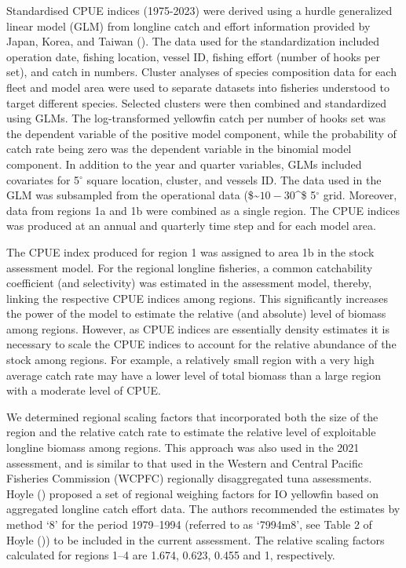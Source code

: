 \documentclass[
]{scrartcl}
\begin{document}
Standardised CPUE indices (1975-2023) were derived using a hurdle
generalized linear model (GLM) from longline catch and effort
information provided by Japan, Korea, and Taiwan
().
The data used for the standardization included operation date, fishing
location, vessel ID, fishing effort (number of hooks per set), and catch
in numbers. Cluster analyses of species composition data for each fleet
and model area were used to separate datasets into fisheries understood
to target different species. Selected clusters were then combined and
standardized using GLMs. The log-transformed yellowfin catch per number
of hooks set was the dependent variable of the positive model component,
while the probability of catch rate being zero was the dependent
variable in the binomial model component. In addition to the year and
quarter variables, GLMs included covariates for 5\(^\circ\) square
location, cluster, and vessels ID. The data used in the GLM was
subsampled from the operational data (\$\sim\(10-30%
\)\^{}\circ \times\$ 5\(^\circ\) grid. Moreover, data from regions 1a
and 1b were combined as a single region. The CPUE indices was produced
at an annual and quarterly time step and for each model area.

The CPUE index produced for region 1 was assigned to area 1b in the
stock assessment model. For the regional longline fisheries, a common
catchability coefficient (and selectivity) was estimated in the
assessment model, thereby, linking the respective CPUE indices among
regions. This significantly increases the power of the model to estimate
the relative (and absolute) level of biomass among regions. However, as
CPUE indices are essentially density estimates it is necessary to scale
the CPUE indices to account for the relative abundance of the stock
among regions. For example, a relatively small region with a very high
average catch rate may have a lower level of total biomass than a large
region with a moderate level of CPUE.

We determined regional scaling factors that incorporated both the size
of the region and the relative catch rate to estimate the relative level
of exploitable longline biomass among regions. This approach was also
used in the 2021 assessment, and is similar to that used in the Western
and Central Pacific Fisheries Commission (WCPFC) regionally
disaggregated tuna assessments. Hoyle
() proposed a set of
regional weighing factors for IO yellowfin based on aggregated longline
catch effort data. The authors recommended the estimates by method `8'
for the period 1979--1994 (referred to as `7994m8', see Table 2 of Hoyle
()) to be included in
the current assessment. The relative scaling factors calculated for
regions 1--4 are 1.674, 0.623, 0.455 and 1, respectively.
\end{document}

